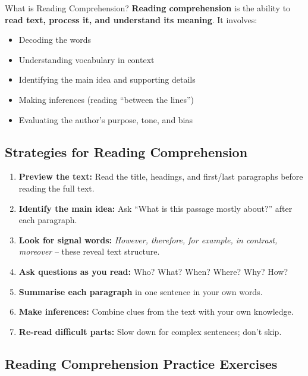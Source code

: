 \documentclass[12pt,a4paper]{article}
\begin{document}
\begin{keybox}{What is Reading Comprehension?}
\textbf{Reading comprehension} is the ability to \textbf{read text, process it, and understand its meaning}. It involves:
\begin{itemize}[noitemsep]
    \item Decoding the words
    \item Understanding vocabulary in context
    \item Identifying the main idea and supporting details
    \item Making inferences (reading ``between the lines'')
    \item Evaluating the author's purpose, tone, and bias
\end{itemize}
\end{keybox}

\subsection{Strategies for Reading Comprehension}

\begin{enumerate}
    \item \textbf{Preview the text:} Read the title, headings, and first/last paragraphs before reading the full text.
    \item \textbf{Identify the main idea:} Ask ``What is this passage mostly about?'' after each paragraph.
    \item \textbf{Look for signal words:} \textit{However, therefore, for example, in contrast, moreover} -- these reveal text structure.
    \item \textbf{Ask questions as you read:} Who? What? When? Where? Why? How?
    \item \textbf{Summarise each paragraph} in one sentence in your own words.
    \item \textbf{Make inferences:} Combine clues from the text with your own knowledge.
    \item \textbf{Re-read difficult parts:} Slow down for complex sentences; don't skip.
\end{enumerate}

\subsection{Reading Comprehension Practice Exercises}
\end{document}

